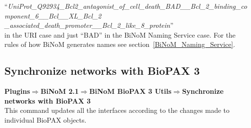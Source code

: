 “\textit{UniProt\_Q92934\_Bcl2\_antagonist\_of\_cell\_death\_BAD\_\_Bcl\_2\_binding\_component\_6\_\_Bcl\_\_XL\_Bcl\_2\\
\_associated\_death\_promoter\_\_Bcl\_2\_like\_8\_protein}”\\

in the URI case and just “BAD” in the BiNoM Naming Service case. For the rules of how BiNoM generates names see section~\ref{BiNoM_Naming_Service}.

\subsection{Synchronize networks with BioPAX 3}
\textbf{Plugins$\Rightarrow$BiNoM 2.1$\Rightarrow$BiNoM BioPAX 3 Utils$\Rightarrow$Synchronize networks with BioPAX 3}\\
This command updates all the interfaces according to the changes made to individual BioPAX objects.
